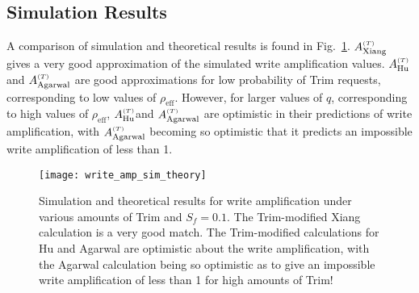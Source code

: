 \documentclass[prodmode,acmtos]{acmsmall}
\begin{document}
\subsection{Simulation Results}
A comparison of simulation and theoretical results is found in Fig.~\ref{fig:write_amp_sim_theory}.  $A_\text{Xiang}^{\text{\tiny ($T$)}}$ gives a very good approximation of the simulated write amplification values. $A_\text{Hu}^{\text{\tiny ($T$)}}$ and $A_\text{Agarwal}^{\text{\tiny ($T$)}}$ are good approximations for low probability of Trim requests, corresponding to low values of $\rho_\text{eff}$.  However, for larger values of $q$, corresponding to high values of $\rho_\text{eff}$, $A_\text{Hu}^{\text{\tiny ($T$)}}$and $A_\text{Agarwal}^{\text{\tiny ($T$)}}$ are optimistic in their predictions of write amplification, with $A_\text{Agarwal}^{\text{\tiny ($T$)}}$ becoming so optimistic that it predicts an impossible write amplification of less than 1.

\begin{figure}
\centerline{\texttt{[image: write\_amp\_sim\_theory]}}
\caption{Simulation and theoretical results for write amplification under various amounts of Trim and $S_f=0.1$.  The Trim-modified Xiang calculation is a very good match.  The Trim-modified calculations for Hu and Agarwal are optimistic about the write amplification, with the Agarwal calculation being so optimistic as to give an impossible write amplification of less than 1 for high amounts of Trim!}
\label{fig:write_amp_sim_theory}
\end{figure}
\end{document}

